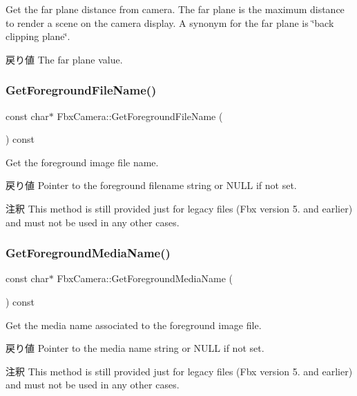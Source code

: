 Get the far plane distance from camera. The far plane is the maximum distance to render a scene on the camera display. A synonym for the far plane is \char`\"{}back clipping plane\char`\"{}. \begin{DoxyReturn}{戻り値}
The far plane value. 
\end{DoxyReturn}
\mbox{\label{class_fbx_camera_abe9513ba9360600c1691e9e96310ee85}} 
\subsubsection{\texorpdfstring{Get\+Foreground\+File\+Name()}{GetForegroundFileName()}}
{\footnotesize\ttfamily const char$\ast$ Fbx\+Camera\+::\+Get\+Foreground\+File\+Name (\begin{DoxyParamCaption}{ }\end{DoxyParamCaption}) const}

Get the foreground image file name. \begin{DoxyReturn}{戻り値}
Pointer to the foreground filename string or {\ttfamily N\+U\+LL} if not set. 
\end{DoxyReturn}
\begin{DoxyRemark}{注釈}
This method is still provided just for legacy files (Fbx version 5. and earlier) and must not be used in any other cases. 
\end{DoxyRemark}
\mbox{\label{class_fbx_camera_a3ce6171880a10098f2b3bc21e0ee5427}} 
\subsubsection{\texorpdfstring{Get\+Foreground\+Media\+Name()}{GetForegroundMediaName()}}
{\footnotesize\ttfamily const char$\ast$ Fbx\+Camera\+::\+Get\+Foreground\+Media\+Name (\begin{DoxyParamCaption}{ }\end{DoxyParamCaption}) const}

Get the media name associated to the foreground image file. \begin{DoxyReturn}{戻り値}
Pointer to the media name string or {\ttfamily N\+U\+LL} if not set. 
\end{DoxyReturn}
\begin{DoxyRemark}{注釈}
This method is still provided just for legacy files (Fbx version 5. and earlier) and must not be used in any other cases. 
\end{DoxyRemark}
\mbox{\label{class_fbx_camera_a21876836377a4b548df5e08c6afe8a17}} 
